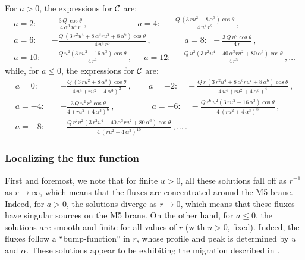 \documentclass[11pt]{article}
\def\cC{{\cal C}}
\numberwithin{equation}{section}
\begin{document}
For $a>0$, the expressions for $\cC$ are:
% 
\begin{equation}
\begin{aligned}
a= 2:  \ \ &    - \frac{3\, Q\, \cos \theta }{4\, \alpha^3 \, u^4 \, r}  \,,\qquad\qquad\qquad   a = 4:   \ \    - \frac{Q\, (3\, r u^2 + 8\, \alpha^3)\cos \theta }{4\, u^4 \, r^2 } \,,  \\
a= 6:   \ \   & - \frac{ Q\, (3\, r^2 u^4+ 8\, \alpha^3 r u^2 + 8\, \alpha^6) \cos \theta }{4\, u^4 \, r^3 }  \,,\qquad\qquad a= 8:   \ \    - \frac{3\, Q\, u^2 \cos \theta }{4\, r} \,,  \\
a= 10:   \ \  & - \frac{Q\, u^2(3\, r u^2 - 16\, \alpha^3)\cos \theta }{4\,  r^2 }  \,, \quad   \ \  a= 12:   \    - \frac{Q\, u^2(3\, r^2 u^4 -40 \, \alpha^3 r u^2 + 80\, \alpha^6)\cos \theta }{4\,  r^3 }  \,,  \dots 
\end{aligned}
 \label{C3apos}
\end{equation}
%
while, for $a\le0$, the expressions for $\cC$ are:
% 
\begin{equation}
\begin{aligned}
a= 0: \quad &  - \frac{Q\, (3\, r u^2 + 8\, \alpha^3)\cos \theta }{4\, u^4 \, ( r u^2 + 4\, \alpha^3)^2} \,,  \qquad
 a = -2: \quad  - \frac{ Q\, r\,(3\, r^2 u^4+ 8\, \alpha^3 r u^2 + 8\, \alpha^6) \cos \theta }{4\, u^4 \, ( r u^2 + 4\, \alpha^3)^4 }  \,,  \\
a= -4: \quad   &  - \frac{3\, Q\, u^2 \,r^5 \cos \theta }{4\, ( r u^2 + 4\, \alpha^3)^6 } \,, \qquad\qquad  \ \ 
a= -6: \quad   - \frac{Q\, r^6 \,u^2(3\, r u^2 - 16\, \alpha^3) \cos \theta }{4\, ( r u^2 + 4\, \alpha^3)^8} \,,  \\
a= -8: \quad & - \frac{Q\, r^7 u^2(3\, r^2 u^4 -40 \, \alpha^3 r u^2 + 80\, \alpha^6) \cos \theta }{4\, ( r u^2 + 4\, \alpha^3)^{10}}  \,,  \dots \,.
\end{aligned}
 \label{C3anonpos}
\end{equation}
%


  
\subsubsection{Localizing the flux function}
\label{ss:LocC} 


First and foremost, we note that for finite $u>0$,  all these solutions fall off  as $r^{-1}$ as $r \to \infty$, which means that the fluxes are concentrated around the M5 brane. 
Indeed, for $ a >0$, the solutions diverge as   $r \to 0$, which means that these fluxes have singular sources on the M5 brane.  On the other hand, for $a \le 0$, the solutions are smooth and finite for all values of $r$ (with $u >0$, fixed).  Indeed, the fluxes follow a ``bump-function'' in $r$,  whose profile and peak is determined by $u$ and $\alpha$.  These solutions appear to be exhibiting the  migration described in \cite{Bena:2025uyg}. 
\end{document}
